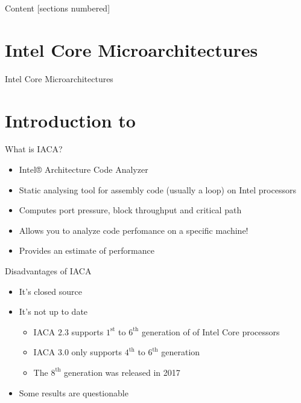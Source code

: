 \documentclass[10pt, tikz,border=2mm, xcolor=dvipsnames]{beamer}
\title{\suaca}
\subtitle{Bachelor talk}
\date{July 26, 2018}
\author{Hendrik Meerkamp}
\institute{}
\begin{document}
    
    \maketitle
    
\begin{frame}{Content}
    [sections numbered]
    \tableofcontents[hideallsubsections]
\end{frame}

\section{Intel Core Microarchitectures}

\begin{frame}{Intel Core Microarchitectures}
    
\end{frame}

\section{Introduction to \iaca}


\begin{frame}{What is IACA?}
\begin{itemize}[<+- | alert@+>]
    \item Intel® Architecture Code Analyzer
    \item Static analysing tool for assembly code (usually a loop) on Intel processors
    \item Computes port pressure, block throughput and critical path
    \item Allows you to analyze code perfomance on a specific machine!
    \item Provides an estimate of performance
\end{itemize}
\end{frame}

\begin{frame}[fragile]{Disadvantages of IACA}
\begin{itemize}[<+- | alert@+>]
    \item It's closed source
    \item It's not up to date
    \begin{itemize}[<+- | alert@+>]
        \item IACA $2.3$ supports $1^{\text{st}}$ to $6^{\text{th}}$ generation of of Intel Core processors
        \item IACA $3.0$ only supports $4^{\text{th}}$ to $6^{\text{th}}$ generation
        \item The $8^{\text{th}}$ generation was released in 2017
    \end{itemize}
    \item Some results are questionable
\end{itemize}
\end{frame}
\end{document}
